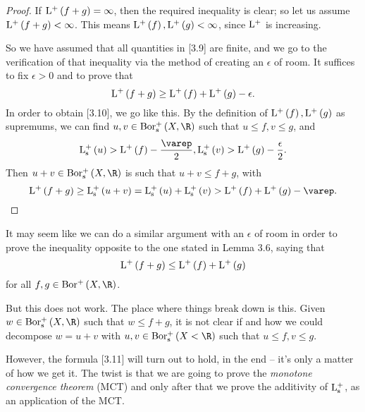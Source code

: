 \documentclass[pmath450]{subfiles}
\begin{document}
    \begin{proof}
        If $\operatorname{L^+}\left( f+g \right)=\infty$, then the required inequality is clear; so let us assume $\operatorname{L^+}\left( f+g \right)<\infty$. This means $\operatorname{L^+}\left( f \right),\operatorname{L^+}\left( g \right)<\infty$, since $\operatorname{L^+}$ is increasing.

        So we have assumed that all quantities in [3.9] are finite, and we go to the verification of that inequality via the method of creating an $\epsilon$ of room. It suffices to fix $\epsilon>0$ and to prove that
        \begin{equation}
            \operatorname{L^+}\left( f+g \right)\geq\operatorname{L^+}\left( f \right)+\operatorname{L^+}\left( g \right)-\epsilon.
        \end{equation}
        In order to obtain [3.10], we go like this. By the definition of $\operatorname{L^+}\left( f \right),\operatorname{L^+}\left( g \right)$ as supremums, we can find $u,v\in\borpluss\left( X,\R \right)$ such that $u\leq f, v\leq g$, and
        \begin{equation*}
            \lpluss\left( u \right)>\lplus\left( f \right)-\frac{\varep}{2} , \lpluss\left( v \right)>\lplus\left( g \right)-\frac{\epsilon}{2}.
        \end{equation*}
        Then $u+v\in\borpluss\left( X,\R \right)$ is such that $u+v\leq f+g$, with
        \begin{equation*}
            \lplus\left( f+g \right)\geq\lpluss\left( u+v \right)=\lpluss\left( u \right)+\lpluss\left( v \right)>\lplus\left( f \right)+\lplus\left( g \right)-\varep.
        \end{equation*}
    \end{proof}

    \np It may seem like we can do a similar argument with an $\epsilon$ of room in order to prove the inequality opposite to the one stated in Lemma 3.6, saying that
    \begin{equation}
        \operatorname{L^+}\left( f+g \right)\leq\operatorname{L^+}\left( f \right)+\operatorname{L^+}\left( g \right)
    \end{equation}
    for all $f,g\in\borplus\left( X,\R \right)$. 

    But this does not work. The place where things break down is this. Given $w\in\borpluss\left( X,\R \right)$ such that $w\leq f+g$, it is not clear if and how we could decompose $w=u+v$ with $u,v\in\borpluss\left( X<\R \right)$ such that $u\leq f, v\leq g$.

    However, the formula [3.11] will turn out to hold, in the end -- it's only a matter of how we get it. The twist is that we are going to prove the \textit{monotone convergence theorem} (MCT) and only after that we prove the additivity of $\operatorname{L^+_s}$, as an application of the MCT.
\end{document}
